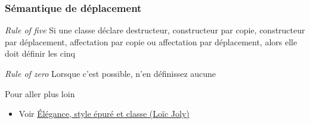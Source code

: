 \documentclass[C++.tex]{subfiles}
\begin{document}
\begin{frame}
	\frametitle{Sémantique de déplacement}
	\begin{block}{\textit{Rule of five}}
		Si une classe déclare destructeur, constructeur par copie, constructeur par déplacement, affectation par copie ou affectation par déplacement, alors elle doit définir les cinq

	\end{block}

	\begin{block}{\textit{Rule of zero}}
		Lorsque c'est possible, n'en définissez aucune

	\end{block}

	\begin{block}{Pour aller plus loin}
		\begin{itemize}
			\item Voir \href{https://github.com/cppp-france/CPPP-19/blob/master/elegance_style_epure_et_classe-Loic_Joly/elegance_style_epure_et_classe-Loic_Joly.pdf}{Élégance, style épuré et classe (Loïc Joly)}
		\end{itemize}
	\end{block}
\end{frame}
\end{document}
